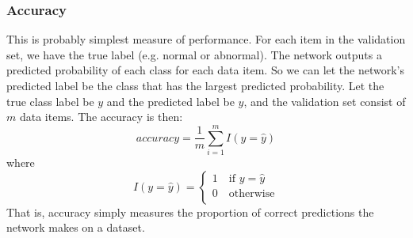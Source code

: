 \documentclass[11pt]{article} %
\theoremstyle{plain}
\theoremstyle{definition}
\begin{document}
\subsubsection{Accuracy}
This is probably simplest measure of performance. For each item in the validation set, we have the true label (e.g. normal or abnormal). The network outputs a predicted probability of each class for each data item. So we can let the network's predicted label be the class that has the largest predicted probability. Let the true class label be \(y\) and the predicted label be \(\hat{y}\), and the validation set consist of \(m\) data items. The accuracy is then:
\[ accuracy = \dfrac{1}{m} \sum_{i=1}^m I(y=\hat{y}) \]
where
\[ I(y=\hat{y}) = \begin{cases}
1 \quad \text{if } y=\hat{y}\\
0 \quad \text{otherwise}\\
\end{cases}\]
That is, accuracy simply measures the proportion of correct predictions the network makes on a dataset.
\end{document}
